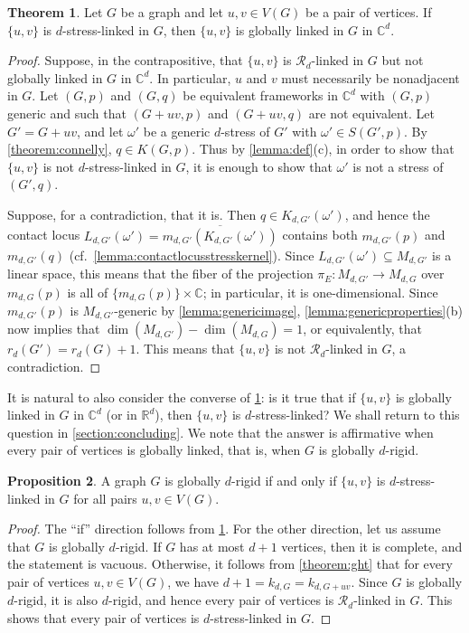 \documentclass[11pt,a4paper,dvipsnames]{scrartcl}
\theoremstyle{definition}
\newtheorem{theorem}{Theorem}[section]
\newtheorem{proposition}[theorem]{Proposition}
\newcommand{\RR}{\mathbb{R}}
\newcommand{\CC}{\mathbb{C}}
\newcommand{\stressnullity}[1]{k_{d, #1}}
\newcommand{\globrig}[1]{globally $#1$-rigid}
\newcommand{\rig}[1]{$#1$-rigid}
\newcommand{\strongly}[1]{${#1}$-stress-linked}
\newcommand{\stresskernel}[2]{K_{{#1},{#2}}}
\newcommand{\sharedstresskernel}[1]{K}
\newcommand{\contactlocus}[2]{L_{#1,#2}}
\begin{document}
\begin{theorem}\label{theorem:nongloballylinked}
    Let $G$ be a graph and let $u,v \in V(G)$ be a pair of vertices. If $\{u,v\}$ is \strongly{d} in $G$, then $\{u,v\}$ is globally linked in $G$ in $\CC^d$.
\end{theorem}
\begin{proof}
    Suppose, in the contrapositive, that $\{u,v\}$ is $\mathcal{R}_d$-linked in $G$ but not globally linked in $G$ in $\CC^d$. In particular, $u$ and $v$ must necessarily be nonadjacent in $G$. Let $(G,p)$ and $(G,q)$ be equivalent frameworks in $\CC^d$ with $(G,p)$ generic and such that $(G+uv,p)$ and $(G+uv,q)$ are not equivalent. Let $G' = G+uv$, and let $\omega'$ be a generic $d$-stress of $G'$ with $\omega' \in S(G',p)$. By \cref{theorem:connelly}, $q \in \sharedstresskernel{d}(G,p)$. Thus by \cref{lemma:def}(c), in order to show that $\{u,v\}$ is not \strongly{d} in $G$, it is enough to show that $\omega'$ is not a stress of $(G',q)$. 
    
    Suppose, for a contradiction, that it is. Then $q \in \stresskernel{d}{G'}(\omega')$, and hence the contact locus $\contactlocus{d}{G'}(\omega') = \overline{m_{d,G'}(\stresskernel{d}{G'}(\omega'))}$ contains both $m_{d,G'}(p)$ and $m_{d,G'}(q)$ (cf.\ \cref{lemma:contactlocusstresskernel}). Since $\contactlocus{d}{G'}(\omega') \subseteq M_{d,G'}$ is a linear space, this means that the fiber of the projection $\pi_E : M_{d,G'} \rightarrow M_{d,G}$ over $m_{d,G}(p)$  is all of $\{m_{d,G}(p)\} \times \CC$; in particular, it is one-dimensional. Since $m_{d,G'}(p)$ is $M_{d,G'}$-generic by \cref{lemma:genericimage}, \cref{lemma:genericproperties}(b) now implies that $\dim(M_{d,G'}) - \dim(M_{d,G}) = 1$, or equivalently, that $r_d(G') = r_d(G) + 1$. This means that $\{u,v\}$ is not $\mathcal{R}_d$-linked in $G$, a contradiction. 
\end{proof}


It is natural to also consider the converse of \cref{theorem:nongloballylinked}: is it true that if $\{u,v\}$ is globally linked in $G$ in $\CC^d$ (or in $\RR^d$), then $\{u,v\}$ is \strongly{d}? We shall return to this question in \cref{section:concluding}. We note that the answer is affirmative when every pair of vertices is globally linked, that is, when $G$ is \globrig{d}.

\begin{proposition}\label{lemma:globallyrigidstronglylinked}
    A graph $G$ is \globrig{d} if and only if $\{u,v\}$ is \strongly{d} in $G$ for all pairs $u,v \in V(G)$.
\end{proposition}
\begin{proof}
    The ``if'' direction follows from \cref{theorem:nongloballylinked}. For the other direction, let us assume that $G$ is \globrig{d}.
    If $G$ has at most $d+1$ vertices, then it is complete, and the statement is vacuous. Otherwise, it follows from \cref{theorem:ght} that for every pair of vertices $u,v \in V(G)$, we have $d+1 = \stressnullity{G} = \stressnullity{G+uv}$. Since $G$ is \globrig{d}, it is also \rig{d}, and hence every pair of vertices is $\mathcal{R}_d$-linked in $G$. This shows that every pair of vertices is \strongly{d} in $G$.
\end{proof}
\end{document}
